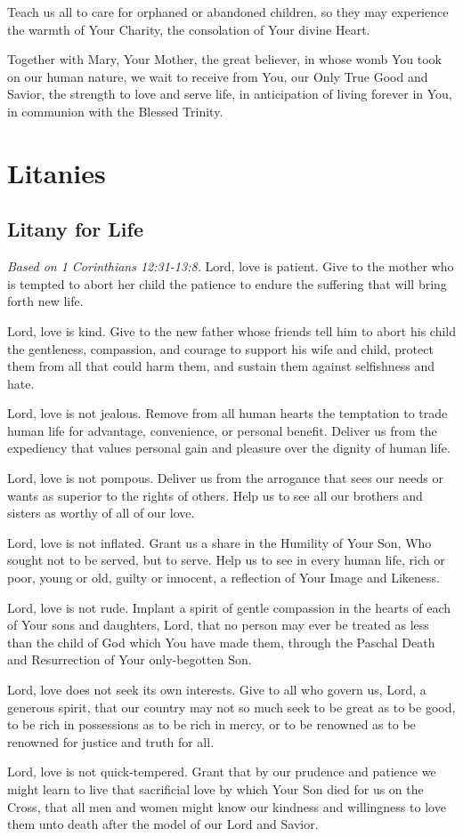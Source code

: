 \documentclass[12pt]{article}
\newcommand{\prayersection}[1]{\section{#1}}
\newcommand{\prayertitle}[1]{\subsection{#1}}
\newcommand{\emphasis}[1]{\emph{#1}}
\newcommand{\emphasis}[1]{\textsl{#1}}
\newcommand{\note}[1]{{\small{\emphasis{#1}}}\newline}
\begin{document}
Teach us all to care for orphaned or abandoned children, so they may experience the warmth of Your Charity, the consolation of Your divine Heart.

Together with Mary, Your Mother, the great believer, in whose womb You took on our human nature, we wait to receive from You, our Only True Good and Savior, the strength to love and serve life, in anticipation of living forever in You, in communion with the Blessed Trinity.

\newpage

\prayersection{Litanies}
\prayertitle{Litany for Life}
\label{prayer:litany_for_life}
\note{Based on 1 Corinthians 12:31-13:8.}
Lord, love is patient.
Give to the mother who is tempted to abort her child the patience to endure the suffering that will bring forth new life.

Lord, love is kind.
Give to the new father whose friends tell him to abort his child the gentleness, compassion, and courage to support his wife and child, protect them from all that could harm them, and sustain them against selfishness and hate.

Lord, love is not jealous.
Remove from all human hearts the temptation to trade human life for advantage, convenience, or personal benefit.
Deliver us from the expediency that values personal gain and pleasure over the dignity of human life.

Lord, love is not pompous.
Deliver us from the arrogance that sees our needs or wants as superior to the rights of others.
Help us to see all our brothers and sisters as worthy of all of our love.

Lord, love is not inflated.
Grant us a share in the Humility of Your Son, Who sought not to be served, but to serve. Help us to see in every human life, rich or poor, young or old, guilty or innocent, a reflection of Your Image and Likeness. 

Lord, love is not rude.
Implant a spirit of gentle compassion in the hearts of each of Your sons and daughters, Lord, that no person may ever be treated as less than the child of God which You have made them, through the Paschal Death and Resurrection of Your only-begotten Son.

Lord, love does not seek its own interests.
Give to all who govern us, Lord, a generous spirit, that our country may not so much seek to be great as to be good, to be rich in possessions as to be rich in mercy, or to be renowned as to be renowned for justice and truth for all.

Lord, love is not quick-tempered.
Grant that by our prudence and patience we might learn to live that sacrificial love by which Your Son died for us on the Cross, that all men and women might know our kindness and willingness to love them unto death after the model of our Lord and Savior.
\end{document}
